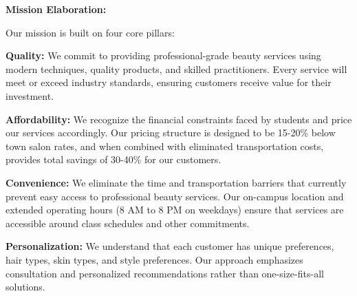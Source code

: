 \textbf{Mission Elaboration:}

Our mission is built on four core pillars:

\textbf{Quality:} We commit to providing professional-grade beauty services using modern techniques, quality products, and skilled practitioners. Every service will meet or exceed industry standards, ensuring customers receive value for their investment.

\textbf{Affordability:} We recognize the financial constraints faced by students and price our services accordingly. Our pricing structure is designed to be 15-20\% below town salon rates, and when combined with eliminated transportation costs, provides total savings of 30-40\% for our customers.

\textbf{Convenience:} We eliminate the time and transportation barriers that currently prevent easy access to professional beauty services. Our on-campus location and extended operating hours (8 AM to 8 PM on weekdays) ensure that services are accessible around class schedules and other commitments.

\textbf{Personalization:} We understand that each customer has unique preferences, hair types, skin types, and style preferences. Our approach emphasizes consultation and personalized recommendations rather than one-size-fits-all solutions.
